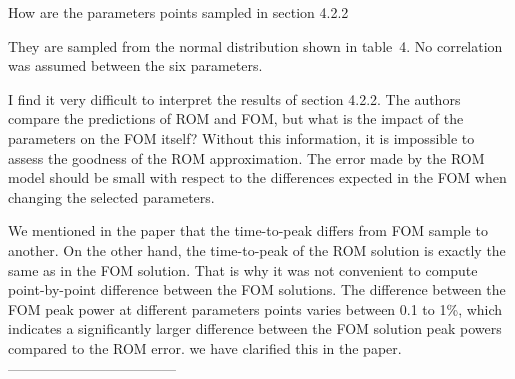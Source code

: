 \documentclass[10pt]{article}
\begin{document}
\begin{response}
 {How are the parameters points sampled in section 4.2.2}
 
 They are sampled from the normal distribution shown in table~4. No correlation was assumed between the six parameters.

\end{response}

\begin{response}
{I find it very difficult to interpret the results of section 4.2.2. The authors compare the predictions of ROM and FOM, but what is the impact of the parameters on the FOM itself? Without this information, it is impossible to assess the goodness of the ROM approximation. The error made by the ROM model should be small with respect to the differences expected in the FOM when changing the selected parameters.}

We mentioned in the paper that the time-to-peak differs from FOM sample to another.
On the other hand, the time-to-peak of the ROM solution is exactly the same as in the FOM solution.
That is why it was not convenient to compute point-by-point difference between the FOM solutions. 
The difference between the FOM peak power at different parameters points varies between 0.1 to 1\%,  which indicates a significantly larger difference between the FOM solution peak powers compared to the ROM error.
we have clarified this in the paper.
------------------------------------
\end{response}
\end{document}
